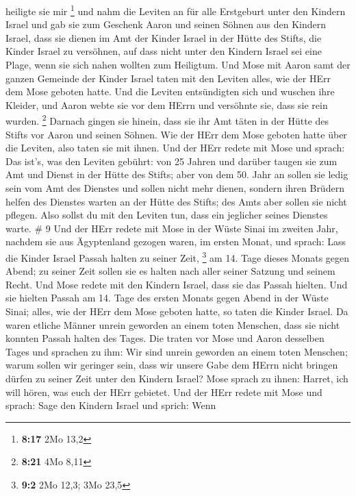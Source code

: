 heiligte sie mir \footnote{\textbf{8:17} 2Mo 13,2}  und
nahm die Leviten an für alle Erstgeburt unter den Kindern Israel
 und gab sie zum Geschenk Aaron und seinen Söhnen aus den
Kindern Israel, dass sie dienen im Amt der Kinder Israel in der Hütte
des Stifts, die Kinder Israel zu versöhnen, auf dass nicht unter den
Kindern Israel sei eine Plage, wenn sie sich nahen wollten zum
Heiligtum.  Und Mose mit Aaron samt der ganzen Gemeinde der
Kinder Israel taten mit den Leviten alles, wie der HErr dem Mose geboten
hatte.  Und die Leviten entsündigten sich und wuschen ihre
Kleider, und Aaron webte sie vor dem HErrn und versöhnte sie, dass sie
rein wurden. \footnote{\textbf{8:21} 4Mo 8,11}  Darnach
gingen sie hinein, dass sie ihr Amt täten in der Hütte des Stifts vor
Aaron und seinen Söhnen. Wie der HErr dem Mose geboten hatte über die
Leviten, also taten sie mit ihnen.  Und der HErr redete mit
Mose und sprach:  Das ist's, was den Leviten gebührt: von
25 Jahren und darüber taugen sie zum Amt und Dienst in der Hütte des
Stifts;  aber von dem 50. Jahr an sollen sie ledig sein vom
Amt des Dienstes und sollen nicht mehr dienen,  sondern
ihren Brüdern helfen des Dienstes warten an der Hütte des Stifts; des
Amts aber sollen sie nicht pflegen. Also sollst du mit den Leviten tun,
dass ein jeglicher seines Dienstes warte. \# 9  Und der HErr
redete mit Mose in der Wüste Sinai im zweiten Jahr, nachdem sie aus
Ägyptenland gezogen waren, im ersten Monat, und sprach: 
Lass die Kinder Israel Passah halten zu seiner Zeit, \footnote{\textbf{9:2}
  2Mo 12,3; 3Mo 23,5}  am 14. Tage dieses Monats gegen
Abend; zu seiner Zeit sollen sie es halten nach aller seiner Satzung und
seinem Recht.  Und Mose redete mit den Kindern Israel, dass
sie das Passah hielten.  Und sie hielten Passah am 14. Tage
des ersten Monats gegen Abend in der Wüste Sinai; alles, wie der HErr
dem Mose geboten hatte, so taten die Kinder Israel.  Da
waren etliche Männer unrein geworden an einem toten Menschen, dass sie
nicht konnten Passah halten des Tages. Die traten vor Mose und Aaron
desselben Tages  und sprachen zu ihm: Wir sind unrein
geworden an einem toten Menschen; warum sollen wir geringer sein, dass
wir unsere Gabe dem HErrn nicht bringen dürfen zu seiner Zeit unter den
Kindern Israel?  Mose sprach zu ihnen: Harret, ich will
hören, was euch der HErr gebietet.  Und der HErr redete mit
Mose und sprach:  Sage den Kindern Israel und sprich: Wenn
